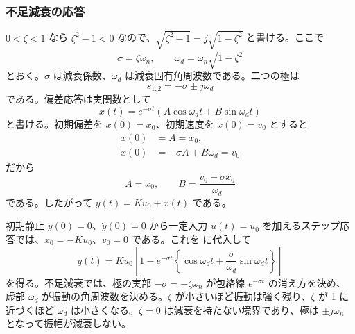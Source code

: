 \subsubsection{不足減衰の応答}
$0<\zeta<1$ なら $\zeta^2-1<0$ なので、$\sqrt{\zeta^2-1}=j\sqrt{1-\zeta^2}$ と書ける。ここで
\begin{equation}
  \sigma=\zeta\omega_n,\qquad
  \omega_d=\omega_n\sqrt{1-\zeta^2}
\end{equation}
とおく。$\sigma$ は減衰係数、$\omega_d$ は減衰固有角周波数である。二つの極は
\begin{equation}
  s_{1,2}=-\sigma\pm j\omega_d
  \label{eq:second-order-poles}
\end{equation}
である。偏差応答は実関数として
\begin{equation}
  x(t)=e^{-\sigma t}
  \left(A\cos\omega_d t+B\sin\omega_d t\right)
  \label{eq:second-order-underdamped-free}
\end{equation}
と書ける。初期偏差を $x(0)=x_0$、初期速度を $\dot{x}(0)=v_0$ とすると
\begin{align}
  x(0)&=A=x_0,\\
  \dot{x}(0)&=-\sigma A+B\omega_d=v_0
\end{align}
だから
\begin{equation}
  A=x_0,\qquad
  B=\frac{v_0+\sigma x_0}{\omega_d}
  \label{eq:second-order-underdamped-constants}
\end{equation}
である。したがって $y(t)=K u_0+x(t)$ である。

初期静止 $y(0)=0$、$\dot{y}(0)=0$ から一定入力 $u(t)=u_0$ を加えるステップ応答では、$x_0=-K u_0$、$v_0=0$ である。これを  に代入して
\begin{equation}
  y(t)=K u_0\left[
    1-e^{-\sigma t}\left\{
      \cos\omega_d t+\frac{\sigma}{\omega_d}\sin\omega_d t
    \right\}
  \right]
  \label{eq:second-order-underdamped-step-general}
\end{equation}
を得る。不足減衰では、極の実部 $-\sigma=-\zeta\omega_n$ が包絡線 $e^{-\sigma t}$ の消え方を決め、虚部 $\omega_d$ が振動の角周波数を決める。$\zeta$ が小さいほど振動は強く残り、$\zeta$ が 1 に近づくほど $\omega_d$ は小さくなる。$\zeta=0$ は減衰を持たない境界であり、極は $\pm j\omega_n$ となって振幅が減衰しない。

